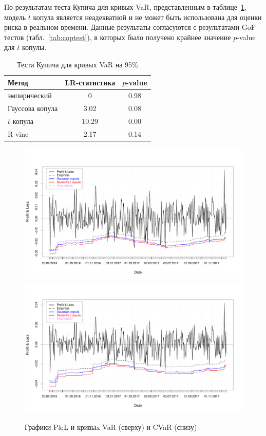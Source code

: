 По результатам теста Купича для кривых VaR, представленным в таблице~\ref{tab:kupiec}, модель $t$ копула является неадекватной и не может быть использована для оценки риска в реальном времени.
Данные результаты согласуются с результатами GoF-тестов (табл.~\ref{tab:coptest}), в которых было получено крайнее значение $p$-value для $t$ копулы.

\begin{table}[h]
    \centering
    \caption{Теста Купича для кривых VaR на 95\%}
    \label{tab:kupiec}
    \setlength{\tabcolsep}{10pt}
    \begin{tabular}{l|c|c} \hline
        Метод & LR-статистика & $p$-value \\ \hline
        эмпирический & 0 & 0.98 \\
        Гауссова копула & 3.02 & 0.08 \\
        $t$ копула & 10.29 & 0.00 \\
        R-vine & 2.17 & 0.14 \\ \hline
    \end{tabular}
\end{table}


\begin{figure}[p]
    \centering
    \includegraphics[width=\textwidth]{images/VaRcurve.pdf}
    \includegraphics[width=\textwidth]{images/EScurve.pdf}
    \caption{Графики P\&L и кривыx VaR (сверху) и CVaR (снизу)}
    \label{ris:VaR-ES-curve}
\end{figure}
